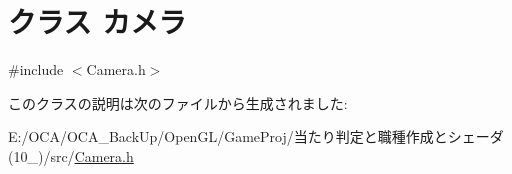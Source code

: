 \hypertarget{class_xE3_x82_xAB_xE3_x83_xA1_xE3_x83_xA9}{\section{クラス カメラ}
\label{class_xE3_x82_xAB_xE3_x83_xA1_xE3_x83_xA9}
}


{\ttfamily \#include $<$Camera.\-h$>$}



このクラスの説明は次のファイルから生成されました\-:\begin{DoxyCompactItemize}
\item 
E\-:/\-O\-C\-A/\-O\-C\-A\-\_\-\-Back\-Up/\-Open\-G\-L/\-Game\-Proj/当たり判定と職種作成とシェーダ(10\-\_)/src/\hyperlink{_camera_8h}{Camera.\-h}\end{DoxyCompactItemize}
